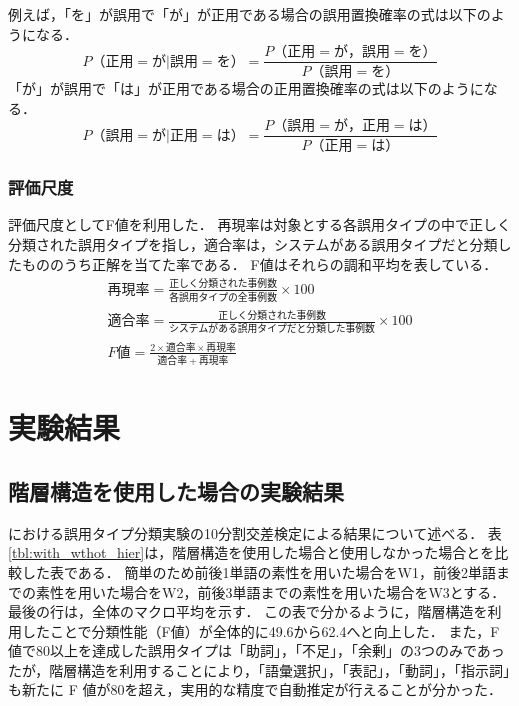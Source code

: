 \documentclass[japanese]{jnlp_1.4}
\newcommand{\ngc}{}
\begin{document}
例えば，「を」が誤用で「が」が正用である場合の誤用置換確率の式は以下のようになる．
\begin{equation}
P （ 正用=が | 誤用=を ） = \frac{P （正用=が ， 誤用=を）}{P （ 誤用=を） } \label{eq:chikan_goyo}
\end{equation}
「が」が誤用で「は」が正用である場合の正用置換確率の式は以下のようになる．
\begin{equation}
P （ 誤用=が|正用=は ） = \frac{P （ 誤用=が， 正用=は）}{P （ 正用=は ） } \label{eq:chikan_seiyo}
\end{equation}


\subsubsection{評価尺度}

評価尺度としてF値を利用した．
再現率は対象とする各誤用タイプの中で正しく分類された誤用タイプを指し，適合率は，システムがある誤用タイプだと分類したもののうち正解を当てた率である．
F値はそれらの調和平均を表している．
\begin{gather} 
 再現率 = \frac{正しく分類された事例数}{各誤用タイプの全事例数}×100 \\[1.5ex]
 適合率 = \frac{正しく分類された事例数}{システムがある誤用タイプだと分類した事例数}×100 \\[1.5ex]
 F値 = \frac{2 \times 適合率 \times 再現率}{適合率 + 再現率}
\end{gather}


\section{実験結果}

\subsection{階層構造を使用した場合の実験結果}

\ngc\hbox{}における誤用タイプ分類実験の10分割交差検定による結果について述べる．
表 \ref{tbl:with_wthot_hier}は，階層構造を使用した場合と使用しなかった場合とを比較した表である．
簡単のため前後1単語の素性を用いた場合をW1，前後2単語までの素性を用いた場合をW2，前後3単語までの素性を用いた場合をW3とする．
最後の行は，全体のマクロ平均を示す．
この表で分かるように，階層構造を利用したことで分類性能（F値）が全体的に49.6から62.4へと向上した．
また，F値で80以上を達成した誤用タイプは「助詞」，「不足」，「余剰」の3つのみであったが，階層構造を利用することにより，「語彙選択」，「表記」，「動詞」，「指示詞」も新たに F 値が80を超え，実用的な精度で自動推定が行えることが分かった．
\end{document}
